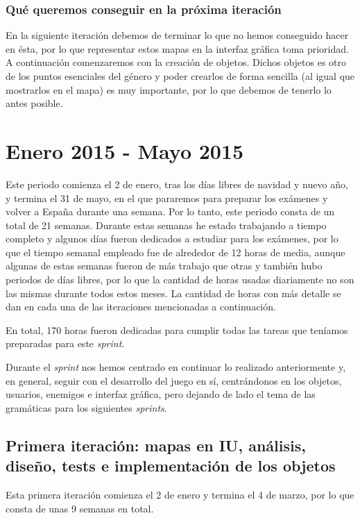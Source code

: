 \subsubsection{Qué queremos conseguir en la próxima iteración}

En la siguiente iteración debemos de terminar lo que no hemos conseguido hacer en ésta, por lo que representar estos mapas en la interfaz gráfica toma prioridad. A continuación comenzaremos con la creación de objetos. Dichos objetos es otro de los puntos esenciales del género y poder crearlos de forma sencilla (al igual que mostrarlos en el mapa) es muy importante, por lo que debemos de tenerlo lo antes posible.

\section{Enero 2015 - Mayo 2015}

Este periodo comienza el 2 de enero, tras los días libres de navidad y nuevo año, y termina el 31 de mayo, en el que pararemos para preparar los exámenes y volver a España durante una semana. Por lo tanto, este periodo consta de un total de 21 semanas. Durante estas semanas he estado trabajando a tiempo completo y algunos días fueron dedicados a estudiar para los exámenes, por lo que el tiempo semanal empleado fue de alrededor de 12 horas de media, aunque algunas de estas semanas fueron de más trabajo que otras y también hubo periodos de días libres, por lo que la cantidad de horas usadas diariamente no son las mismas durante todos estos meses. La cantidad de horas con más detalle se dan en cada una de las iteraciones mencionadas a continuación.

En total, 170 horas fueron dedicadas para cumplir todas las tareas que teníamos preparadas para este \textit{sprint}.

Durante el \textit{sprint} nos hemos centrado en continuar lo realizado anteriormente y, en general, seguir con el desarrollo del juego en sí, centrándonos en los objetos, usuarios, enemigos e interfaz gráfica, pero dejando de lado el tema de las gramáticas para los siguientes \textit{sprints}.

\subsection{Primera iteración: mapas en IU, análisis, diseño, tests e implementación de los objetos}

Esta primera iteración comienza el 2 de enero y termina el 4 de marzo, por lo que consta de unas 9 semanas en total.

